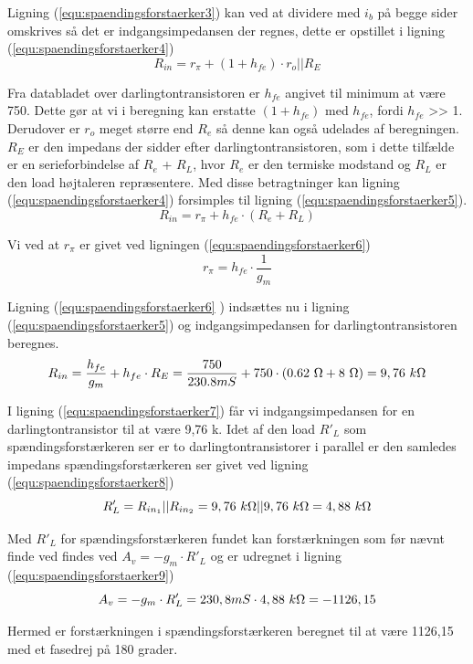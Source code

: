 Ligning (\ref{equ:spaendingsforstaerker3}) kan ved at dividere med $i_b$ på begge sider omskrives så det er indgangsimpedansen der regnes, dette er opstillet i ligning (\ref{equ:spaendingsforstaerker4})
\begin{equation}
\label{equ:spaendingsforstaerker4}
R_{in} = r_{\pi} + (1+h_{fe}) \cdot r_o||R_E 
\end{equation}

Fra databladet over darlingtontransistoren er $h_{fe}$ angivet til minimum at være 750. Dette gør at vi i beregning kan erstatte $(1+h_{fe})$ med $h_{fe}$, fordi $h_{fe}$ >> 1. Derudover er $r_o$ meget større end $R_e$ så denne kan også udelades af beregningen. $R_E$ er den impedans der sidder efter darlingtontransistoren, som i dette tilfælde er en serieforbindelse af $R_e$ + $R_L$, hvor $R_e$ er den termiske modstand og $R_L$ er den load højtaleren repræsentere. Med disse betragtninger kan ligning (\ref{equ:spaendingsforstaerker4}) forsimples til ligning (\ref{equ:spaendingsforstaerker5}).
\begin{equation}
\label{equ:spaendingsforstaerker5}
R_{in} = r_{\pi} + h_{fe} \cdot (R_e + R_L)
\end{equation}

Vi ved at $r_{\pi}$ er givet ved ligningen (\ref{equ:spaendingsforstaerker6})
\begin{equation}
\label{equ:spaendingsforstaerker6}
r_{\pi} = h_{fe} \cdot \frac{1}{g_m}
\end{equation}

Ligning (\ref{equ:spaendingsforstaerker6} ) indsættes nu i ligning (\ref{equ:spaendingsforstaerker5}) og indgangsimpedansen for darlingtontransistoren beregnes.
\begin{equation}
\label{equ:spaendingsforstaerker7}
R_{in} = \frac{h_{fe}}{g_m} + h_{fe} \cdot R_E = \frac{750}{230.8 mS} + 750 \cdot (0.62~\ohm + 8~\ohm) = 9,76~k\ohm  
\end{equation}

I ligning (\ref{equ:spaendingsforstaerker7}) får vi indgangsimpedansen for en darlingtontransistor til at være 9,76 k\ohm. Idet af den load $R'_L$ som spændingsforstærkeren ser er to darlingtontransistorer i parallel er den samledes impedans spændingsforstærkeren ser givet ved ligning (\ref{equ:spaendingsforstaerker8})
\begin{equation}
\label{equ:spaendingsforstaerker8}
R'_L = R_{in_1}||R_{in_2} = 9,76~k\ohm||9,76~k\ohm = 4,88~k\ohm
\end{equation}  

Med $R'_L$ for spændingsforstærkeren fundet kan forstærkningen som før nævnt finde ved findes ved $A_v = -g_m \cdot R'_L$ og er udregnet i ligning (\ref{equ:spaendingsforstaerker9})
\begin{equation}
\label{equ:spaendingsforstaerker9}
A_v = -g_m \cdot R'_L = 230,8 mS \cdot 4,88~k\ohm = -1126,15
\end{equation}

Hermed er forstærkningen i spændingsforstærkeren beregnet til at være 1126,15 med et fasedrej på 180 grader.